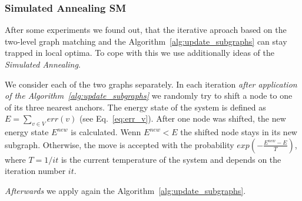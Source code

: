 \FloatBarrier

\subsubsection{Simulated Annealing \textbf{SM}}

After some experiments we found out, that the iterative aproach based on the two-level graph matching and the Algorithm~\ref{alg:update_subgraphs} can stay trapped in local optima.
To cope with this we use additionally ideas of the \emph{Simulated Annealing}.

We consider each of the two graphs separately. In each iteration \emph{after application of the Algorithm~\ref{alg:update_subgraphs}} we randomly try to shift a node to one of its three nearest anchors. The energy state of the system is defined as $E = \sum_{v\in V}err(v)$ (see Eq.~\ref{eq:err_v}). After one node was shifted, the new energy state $E^{new}$ is calculated. Wenn $E^{new}<E$ the shifted node stays in its new subgraph. Otherwise, the move is accepted with the probability $exp(-\frac{E^{new}-E}{T})$, where $T = 1/{it}$ is the current temperature of the system and depends on the iteration number $it$. 

\emph{Afterwards} we apply again the Algorithm~\ref{alg:update_subgraphs}. 

